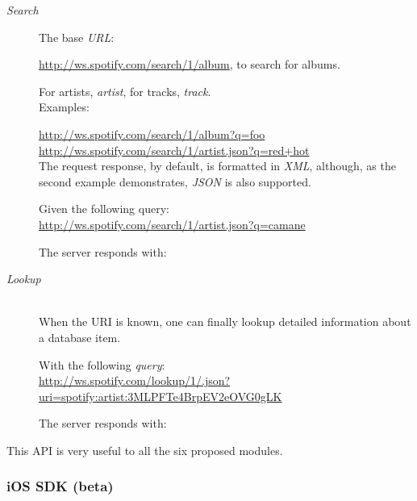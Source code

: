       \begin{description}
        \item[\emph{Search}] \hfill

          The base \emph{URL}:

          \url{http://ws.spotify.com/search/1/album}, to search for albums.

          For artists, \emph{artist}, for tracks, \emph{track}. \\

          Examples:

          \url{http://ws.spotify.com/search/1/album?q=foo} \\
          \url{http://ws.spotify.com/search/1/artist.json?q=red+hot} \\

          The request response, by default, is formatted in \emph{XML}, although, as the second example demonstrates, \emph{JSON} is also supported.

          Given the following query: \\
          \url{http://ws.spotify.com/search/1/artist.json?q=camane}

          The server responds with:

          

        \item[\emph{Lookup}] \hfill \\

          When the URI is known, one can finally lookup detailed information about a database item.

          With the following \emph{query}: \\
          \url{http://ws.spotify.com/lookup/1/.json?uri=spotify:artist:3MLPFTe4BrpEV2eOVG0gLK}

          The server responds with:

          

      \end{description}

      This API is very useful to all the six proposed modules.


    \subsubsection{iOS SDK (beta)} %
    \label{ssub:ios_sdk}
    
